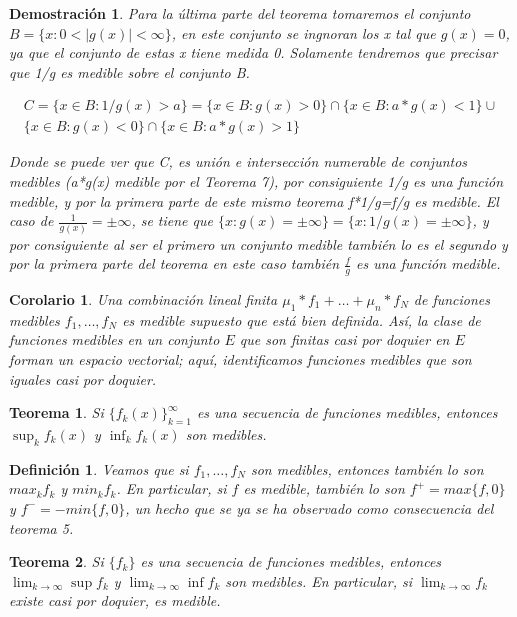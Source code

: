 \documentclass{article}
\newtheorem{theorem}{Teorema}
\newtheorem{corollary}{Corolario}
\newtheorem{definition}{Definición}
\newtheorem{demostration}{Demostración}
\begin{document}
\begin{demostration}
Para la última parte del teorema tomaremos el conjunto $B=\{x: 0 < |g(x)| < \infty\}$, en este conjunto se ingnoran los x tal que $g(x)=0$, ya que el conjunto de estas x tiene medida 0. Solamente tendremos que precisar que 1/g es medible sobre el conjunto B.

\begin{equation}
\begin{split}
C=\{x \in B: 1/g(x) > a\}= \{x \in B: g(x) > 0\} \cap \{x \in B: a*g(x) < 1\} \cup \\
\{x \in B: g(x) < 0\} \cap \{x \in B: a*g(x) > 1\}
\end{split}
\end{equation}

Donde se puede ver que C, es unión e intersección numerable de conjuntos medibles (a*g(x) medible por el Teorema 7), por consiguiente 1/g es una función medible, y por la primera parte de este mismo teorema f*1/g=f/g es medible. El caso de $\frac{1}{g(x)} = \pm \infty$, se tiene que $\{x: g(x)=\pm \infty\} = \{x: 1/g(x)=\pm \infty\}$, y por consiguiente al ser el primero un conjunto medible también lo es el segundo y por la primera parte del teorema en este caso también $\frac{f}{g}$ es una función medible.
\end{demostration}

\begin{corollary}
Una combinación lineal finita $\mu_1*f_1+\ldots+\mu_n*f_N$ de funciones medibles $f_1,\ldots,f_N$ es medible supuesto que está bien definida. Así, la clase de funciones medibles en un conjunto $E$ que son finitas casi por doquier en $E$ forman un espacio vectorial; aquí, identificamos funciones medibles que son iguales casi por doquier.
\end{corollary}

\begin{theorem}
Si $\{f_k(x)\}_{k=1}^{\infty}$ es una secuencia de funciones medibles, entonces $\sup_kf_k(x)$ y $\inf_kf_k(x)$ son medibles.
\end{theorem}

\begin{definition}
Veamos que si $f_1,\ldots,f_N$ son medibles, entonces también lo son $max_kf_k$ y $min_kf_k$. En particular, si $f$ es medible, también lo son $f^+=max\{f,0\}$ y $f^-=-min\{f,0\}$, un hecho que se ya se ha observado como consecuencia del teorema 5.
\end{definition}

\begin{theorem}
Si $\{f_k\}$ es una secuencia de funciones medibles, entonces $\lim_{k \to \infty} \sup f_k$ y $\lim_{k \to \infty} \inf f_k$ son medibles. En particular, si $\lim_{k \to \infty} f_k$ existe casi por doquier, es medible.
\end{theorem}
\end{document}
